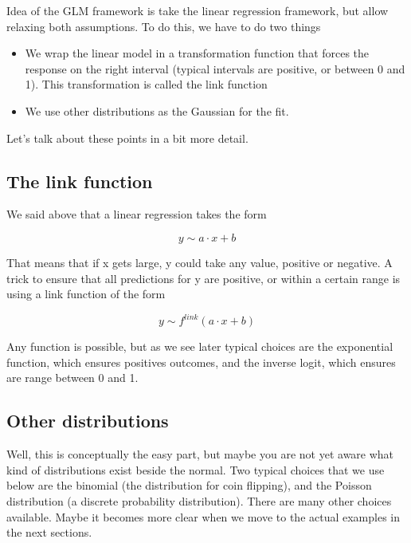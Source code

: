 \documentclass[a4paper,twoside]{tufte-book} %
\begin{document}
Idea of the GLM framework is take the linear regression framework, but allow relaxing both assumptions. To do this, we have to do two things

\begin{itemize}
	\item   We wrap the linear model in a transformation function that forces the response on the right interval (typical intervals are positive, or between 0 and 1). This transformation is called the link function
	\item We use other distributions as the Gaussian for the fit.
\end{itemize}    
   
Let's talk about these points in a bit more detail.

\subsection{The link function}

We said above that a linear regression takes the form 

\begin{equation}
y \sim a \cdot x + b 
\end{equation}

That means that if x gets large, y could take any value, positive or negative. A trick to ensure that all predictions for y are positive, or within a certain range is using a link function of the form 

\begin{equation}
y \sim f^{link}(a \cdot x + b )
\end{equation}

Any function is possible, but as we see later typical choices are the exponential function, which ensures positives outcomes, and the inverse logit, which ensures are range between 0 and 1.

\subsection{Other distributions}

Well, this is conceptually the easy part, but maybe you are not yet aware what kind of distributions exist beside the normal. Two typical choices that we use below are the binomial (the distribution for coin flipping), and the Poisson distribution (a discrete probability distribution). There are many other choices available. Maybe it becomes more clear when we move to the actual examples in the next sections. 
\end{document}
